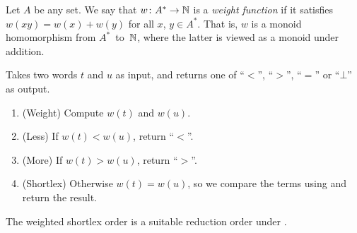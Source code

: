 \documentclass[../generics]{subfiles}
\begin{document}
\begin{definition}
Let $A$ be any set. We say that $w\colon A^*\rightarrow\mathbb{N}$ is a \emph{weight function} if it satisfies $w(xy)=w(x)+w(y)$ for all $x$, $y\in A^*$. That is, $w$ is a monoid homomorphism from $A^*$~to~$\mathbb{N}$, where the latter is viewed as a monoid under addition.
\end{definition}

\begin{algorithm}\label{rqm reduction order}
Takes two words $t$ and $u$ as input, and returns one of ``$<$'', ``$>$'', ``$=$'' or \index{$\bot$}``$\bot$'' as output.
\begin{enumerate}
\item (Weight) Compute $w(t)$ and $w(u)$.
\item (Less) If $w(t)<w(u)$, return ``$<$''.
\item (More) If $w(t)>w(u)$, return ``$>$''.
\item (Shortlex) Otherwise $w(t)=w(u)$, so we compare the terms using  and return the result.
\end{enumerate}
\end{algorithm}

The weighted shortlex order is a suitable reduction order under .
\end{document}
